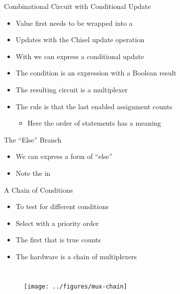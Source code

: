 \begin{frame}[fragile]{Combinational Circuit with Conditional Update}
\begin{itemize}
\item Value first needs to be wrapped into a 
\item Updates with the Chisel update operation \code{:=}
\item With  we can express a conditional update
\item The condition is an expression with a Boolean result
\item The resulting circuit is a multiplexer
\item The rule is that the last enabled assignment counts
\begin{itemize}
\item Here the order of statements has a meaning
\end{itemize}
\end{itemize}
\end{frame}

\begin{frame}[fragile]{The ``Else'' Branch}
\begin{itemize}
\item We can express a form of ``else''
\item Note the  in 
\end{itemize}
\end{frame}



\begin{frame}[fragile]{A Chain of Conditions}
\begin{itemize}
\item To test for different conditions
\item Select with a priority order
\item The first that is true counts
\item The hardware is a chain of multiplexers
\end{itemize}
\begin{columns}
\begin{figure}
  \texttt{[image: ../figures/mux-chain]}
\end{figure}
\end{columns}
\end{frame}

